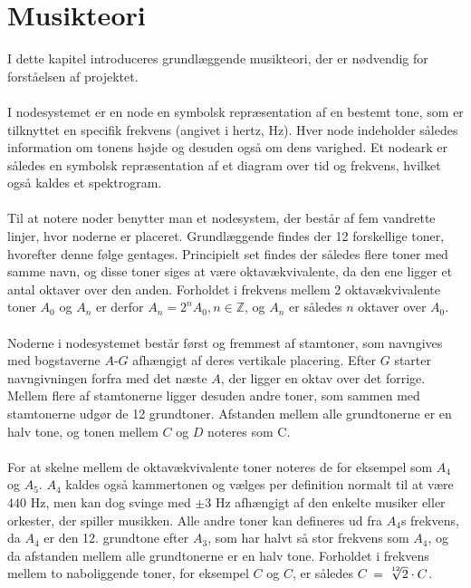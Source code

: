 \chapter{Musikteori}
I dette kapitel introduceres grundlæggende musikteori, der er nødvendig for forståelsen af projektet.
\\ \\
I nodesystemet er en node en symbolsk repræsentation af en bestemt tone, som er tilknyttet en specifik frekvens (angivet i hertz, Hz). Hver node indeholder således information om tonens højde og desuden også om dens varighed. Et nodeark er således en symbolsk repræsentation af et diagram over tid og frekvens, hvilket også kaldes et spektrogram.
\\ \\
Til at notere noder benytter man et nodesystem, der består af fem vandrette linjer, hvor noderne er placeret. Grundlæggende findes der 12 forskellige toner, hvorefter denne følge gentages. Principielt set findes der således flere toner med samme navn, og disse toner siges at være oktavækvivalente, da den ene ligger et antal oktaver over den anden. Forholdet i frekvens mellem 2 oktavækvivalente toner $A_0$ og $A_n$ er derfor $A_n = 2^n A_0, n \in \mathbb{Z}$, og $A_n$ er således $n$ oktaver over $A_0$.
\\ \\
Noderne i nodesystemet består først og fremmest af stamtoner, som navngives med bogstaverne $A$-$G$ afhængigt af deres vertikale placering. Efter $G$ starter navngivningen forfra med det næste $A$, der ligger en oktav over det forrige. Mellem flere af stamtonerne ligger desuden andre toner, som sammen med stamtonerne udgør de 12 grundtoner. Afstanden mellem alle grundtonerne er en halv tone, og tonen mellem $C$ og $D$ noteres som C\hashsharp{}.
\\ \\
For at skelne mellem de oktavækvivalente toner noteres de for eksempel som $A_4$ og $A_5$. $A_4$ kaldes også kammertonen og vælges per definition normalt til at være $440$ Hz, men kan dog svinge med $\pm 3$ Hz afhængigt af den enkelte musiker eller orkester, der spiller musikken. Alle andre toner kan defineres ud fra $A_4$s frekvens, da $A_4$ er den 12. grundtone efter $A_3$, som har halvt så stor frekvens som $A_4$, og da afstanden mellem alle grundtonerne er en halv tone. Forholdet i frekvens mellem to naboliggende toner, for eksempel $C$ og $C$\hashsharp, er således $C$\hashsharp \ $= \sqrt[\leftroot{-2}\uproot{2}12]{2} \cdot C$.